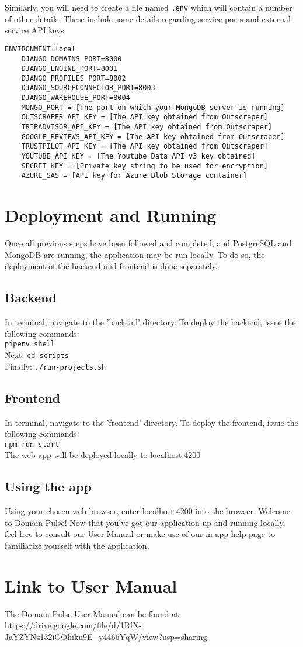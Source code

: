 \documentclass[12pt]{article}
\begin{document}
Similarly, you will need to create a file named \texttt{.env} which will contain a number of other details. These include some details
regarding service ports and external service API keys.
\begin{lstlisting}[basicstyle=\ttfamily]
    ENVIRONMENT=local
    DJANGO_DOMAINS_PORT=8000
    DJANGO_ENGINE_PORT=8001
    DJANGO_PROFILES_PORT=8002
    DJANGO_SOURCECONNECTOR_PORT=8003
    DJANGO_WAREHOUSE_PORT=8004
    MONGO_PORT = [The port on which your MongoDB server is running]
    OUTSCRAPER_API_KEY = [The API key obtained from Outscraper]
    TRIPADVISOR_API_KEY = [The API key obtained from Outscraper]
    GOOGLE_REVIEWS_API_KEY = [The API key obtained from Outscraper]
    TRUSTPILOT_API_KEY = [The API key obtained from Outscraper]
    YOUTUBE_API_KEY = [The Youtube Data API v3 key obtained]
    SECRET_KEY = [Private key string to be used for encryption]
    AZURE_SAS = [API key for Azure Blob Storage container]
\end{lstlisting}



\section{Deployment and Running}
Once all previous steps have been followed and completed, and PostgreSQL and MongoDB are running, the application may be run locally. To do so,
the deployment of the backend and frontend is done separately.
\subsection{Backend}
In terminal, navigate to the 'backend' directory. To deploy the backend, issue the following commands:\\ \texttt{pipenv shell}
\\Next: \texttt{cd scripts}\\
Finally: \texttt{./run-projects.sh}\\

\subsection{Frontend}
In terminal, navigate to the 'frontend' directory. To deploy the frontend, issue the following commands:\\
\texttt{npm run start}\\
The web app will be deployed locally to localhost:4200

\subsection{Using the app}
Using your chosen web browser, enter localhost:4200 into the browser. Welcome to Domain Pulse! Now that you've got our application
up and running locally, feel free to consult our User Manual or make use of our in-app help page to familiarize yourself with the application.

\section{Link to User Manual}
The Domain Pulse User Manual can be found at: \url{https://drive.google.com/file/d/1RfX-JaYZYNz132iGOhiku9E_y4466YqW/view?usp=sharing}
\end{document}
